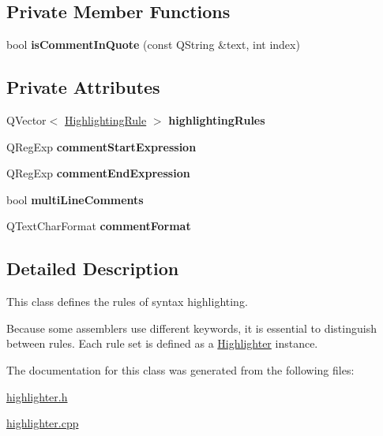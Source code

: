 \subsection*{Private Member Functions}
\begin{DoxyCompactItemize}
\item 
\hypertarget{class_highlighter_a17ed99316195809e6bb92711a959eecf}{}bool {\bfseries is\+Comment\+In\+Quote} (const Q\+String \&text, int index)\label{class_highlighter_a17ed99316195809e6bb92711a959eecf}

\end{DoxyCompactItemize}
\subsection*{Private Attributes}
\begin{DoxyCompactItemize}
\item 
\hypertarget{class_highlighter_aa23f8b3f4ddd1354f508b46d77897fe5}{}Q\+Vector$<$ \hyperlink{struct_assembler_1_1_highlighting_rule}{Highlighting\+Rule} $>$ {\bfseries highlighting\+Rules}\label{class_highlighter_aa23f8b3f4ddd1354f508b46d77897fe5}

\item 
\hypertarget{class_highlighter_a67cdecd667929b4eefbc7057d58cd90b}{}Q\+Reg\+Exp {\bfseries comment\+Start\+Expression}\label{class_highlighter_a67cdecd667929b4eefbc7057d58cd90b}

\item 
\hypertarget{class_highlighter_a3baa1033bbdf70a16df42940968b72b4}{}Q\+Reg\+Exp {\bfseries comment\+End\+Expression}\label{class_highlighter_a3baa1033bbdf70a16df42940968b72b4}

\item 
\hypertarget{class_highlighter_ad4ea108a70fbf74e69439a35261fb36b}{}bool {\bfseries multi\+Line\+Comments}\label{class_highlighter_ad4ea108a70fbf74e69439a35261fb36b}

\item 
\hypertarget{class_highlighter_a1b7ef37cb63af92ab17f91885922418d}{}Q\+Text\+Char\+Format {\bfseries comment\+Format}\label{class_highlighter_a1b7ef37cb63af92ab17f91885922418d}

\end{DoxyCompactItemize}


\subsection{Detailed Description}
This class defines the rules of syntax highlighting. 

Because some assemblers use different keywords, it is essential to distinguish between rules. Each rule set is defined as a \hyperlink{class_highlighter}{Highlighter} instance. 

The documentation for this class was generated from the following files\+:\begin{DoxyCompactItemize}
\item 
\hyperlink{highlighter_8h}{highlighter.\+h}\item 
\hyperlink{highlighter_8cpp}{highlighter.\+cpp}\end{DoxyCompactItemize}
